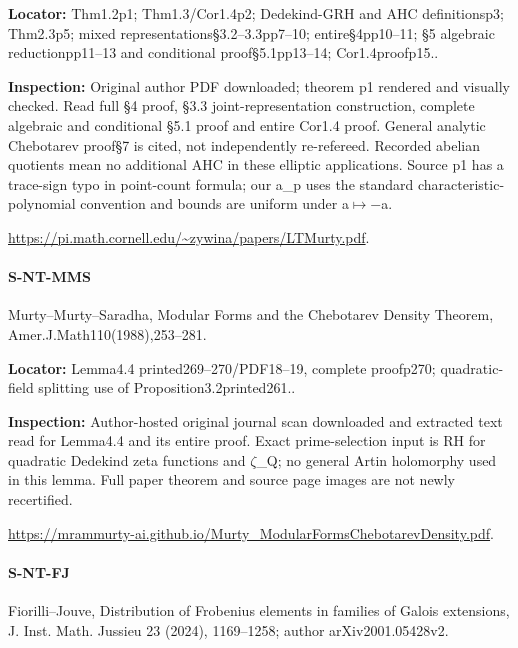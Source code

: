 \documentclass[11pt,a4paper]{article}
\begin{document}
\textbf{Locator:} Thm1.\allowbreak{}2p1; Thm1.\allowbreak{}3/\allowbreak{}Cor1.\allowbreak{}4p2; Dedekind-GRH and AHC definitionsp3; Thm2.\allowbreak{}3p5; mixed representations§3.\allowbreak{}2–\allowbreak{}3.\allowbreak{}3pp7–\allowbreak{}10; entire§4pp10–\allowbreak{}11; §5 algebraic reductionpp11–\allowbreak{}13 and conditional proof§5.\allowbreak{}1pp13–\allowbreak{}14; Cor1.\allowbreak{}4proofp15.\allowbreak{}.

\textbf{Inspection:} Original author PDF downloaded; theorem p1 rendered and visually checked.\allowbreak{} Read full §4 proof, §3.\allowbreak{}3 joint-representation construction, complete algebraic and conditional §5.\allowbreak{}1 proof and entire Cor1.\allowbreak{}4 proof.\allowbreak{} General analytic Chebotarev proof§7 is cited, not independently re-refereed.\allowbreak{} Recorded abelian quotients mean no additional AHC in these elliptic applications.\allowbreak{} Source p1 has a trace-sign typo in point-count formula; our a\_\allowbreak{}p uses the standard characteristic-polynomial convention and bounds are uniform under a\ensuremath{\mapsto}\ensuremath{-}a.\allowbreak{}

\url{https://pi.math.cornell.edu/~zywina/papers/LTMurty.pdf}.

\paragraph{S-NT-MMS} Murty–\allowbreak{}Murty–\allowbreak{}Saradha, Modular Forms and the Chebotarev Density Theorem, Amer.\allowbreak{}J.\allowbreak{}Math110(1988),253–\allowbreak{}281.

\textbf{Locator:} Lemma4.\allowbreak{}4 printed269–\allowbreak{}270/\allowbreak{}PDF18–\allowbreak{}19, complete proofp270; quadratic-field splitting use of Proposition3.\allowbreak{}2printed261.\allowbreak{}.

\textbf{Inspection:} Author-hosted original journal scan downloaded and extracted text read for Lemma4.\allowbreak{}4 and its entire proof.\allowbreak{} Exact prime-selection input is RH for quadratic Dedekind zeta functions and \ensuremath{\zeta}\_\allowbreak{}Q; no general Artin holomorphy used in this lemma.\allowbreak{} Full paper theorem and source page images are not newly recertified.\allowbreak{}

\url{https://mrammurty-ai.github.io/Murty_ModularFormsChebotarevDensity.pdf}.

\paragraph{S-NT-FJ} Fiorilli–\allowbreak{}Jouve, Distribution of Frobenius elements in families of Galois extensions, J.\allowbreak{} Inst.\allowbreak{} Math.\allowbreak{} Jussieu 23 (2024), 1169–\allowbreak{}1258; author arXiv2001.\allowbreak{}05428v2.
\end{document}
